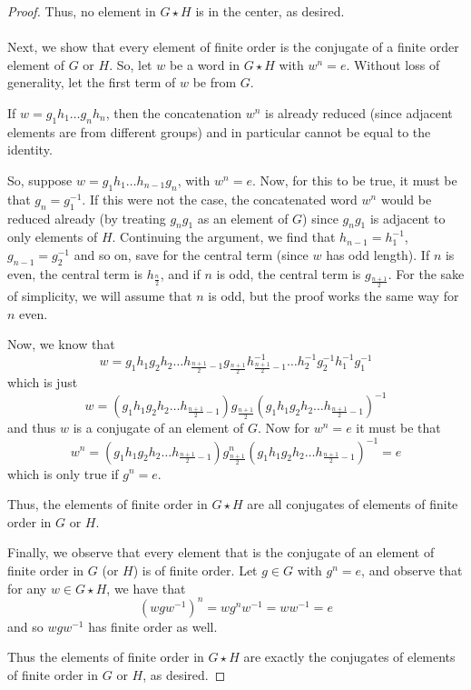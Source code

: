 \documentclass[fontsize=11pt]{scrartcl} %
\numberwithin{equation}{section} %
\numberwithin{figure}{section} %
\numberwithin{table}{section} %
\begin{document}
\begin{proof}
    Thus, no element in $G\star H$ is in the center, as desired.
    \\
    \\
    Next, we show that every element of finite order is the conjugate of a
    finite order element of $G$ or $H$. So, let $w$ be a word in $G\star H$ with
    $w^n = e$. Without loss of generality, let the first term of $w$ be from
    $G$.

    If $w = g_1h_1\dots g_nh_n$, then the concatenation $w^n$ is already reduced
    (since adjacent elements are from different groups) and in particular cannot
    be equal to the identity.

    So, suppose $w = g_1h_1\dots h_{n-1}g_{n}$, with $w^n = e$. Now, for this to
    be true, it must be that $g_n=g_1^{-1}$. If this were not the case, the
    concatenated word $w^n$ would be reduced already (by treating $g_ng_1$ as an
    element of $G$) since $g_ng_1$ is adjacent to only elements of $H$.
    Continuing the argument, we find that $h_{n-1} = h_1^{-1}$,
    $g_{n-1}=g_2^{-1}$ and so on, save for the central term (since $w$ has odd
    length). If $n$ is even, the central term is $h_{\frac{n}{2}}$, and if $n$
    is odd, the central term is $g_{\frac{n+1}{2}}$. For the sake of simplicity,
    we will assume that $n$ is odd, but the proof works the same way for $n$
    even.

    Now, we know that
    \[
        w = g_1h_1g_2h_2\dots h_{\frac{n+1}{2}-1}
        g_{\frac{n+1}{2}}h_{\frac{n+1}{2}-1}^{-1}\dots h_2^{-1}g_2^{-1}h_1^{-1}g_1^{-1}
    \]
    which is just
    \[
        w= (g_1h_1g_2h_2\dots
        h_{\frac{n+1}{2}-1})g_{\frac{n+1}{2}}(g_1h_1g_2h_2\dots
        h_{\frac{n+1}{2}-1})^{-1}
    \]
    and thus $w$ is a conjugate of an element of $G$. Now for $w^n = e$ it must
    be that 
    \[
        w^n = 
        (g_1h_1g_2h_2\dots
        h_{\frac{n+1}{2}-1})g^n_{\frac{n+1}{2}}(g_1h_1g_2h_2\dots
        h_{\frac{n+1}{2}-1})^{-1} = e
    \]
    which is only true if $g^n = e$.

    Thus, the elements of finite order in $G\star H$ are all conjugates of
    elements of finite order in $G$ or $H$.

    Finally, we observe that every element that is the conjugate of an element
    of finite order in $G$ (or $H$) is of finite order. Let $g\in G$ with $g^n =
    e$, and observe that for any $w\in G\star H$, we have that
    \[
        (wgw^{-1})^n = wg^nw^{-1} = ww^{-1} = e
    \]
    and so $wgw^{-1}$ has finite order as well.

    Thus the elements of finite order in $G\star H$ are exactly the conjugates
    of elements of finite order in $G$ or $H$, as desired.
\end{proof}
\end{document}
